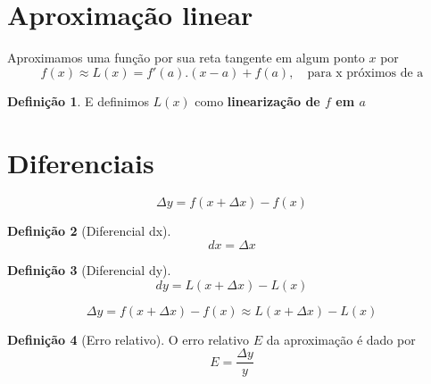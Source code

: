 \documentclass[14pt]{extreport}
\theoremstyle{definition}
\newtheorem{definition}{Definição}
\begin{document}
\section{Aproximação linear}

Aproximamos uma função por sua reta tangente em algum ponto \(x\) por
\begin{equation}
    f(x) \approx L(x) = f'(a).(x-a) + f(a), \quad \text{para x próximos de a}    
\end{equation}
\begin{definition}
    E definimos \(L(x)\) como \textbf{linearização de \(f\) em \(a\)}
\end{definition}

\section{Diferenciais}

\begin{equation}
    \Delta y = f(x + \Delta x) - f(x)
\end{equation}

\begin{definition}[Diferencial dx]
    \begin{equation}
        dx = \Delta x
    \end{equation}
    
\end{definition}

\begin{definition}[Diferencial dy]
    \begin{equation}
        dy = L(x + \Delta x) - L(x)
    \end{equation}
    
\end{definition}

\begin{equation}
    \Delta y = f(x + \Delta x) - f(x) \approx L(x + \Delta x) - L(x)
\end{equation}

\begin{definition}[Erro relativo]
    O erro relativo \(E\) da aproximação é dado por
    \begin{equation}
        E = \frac{\Delta y}{y}    
    \end{equation}
\end{definition}
\end{document}
